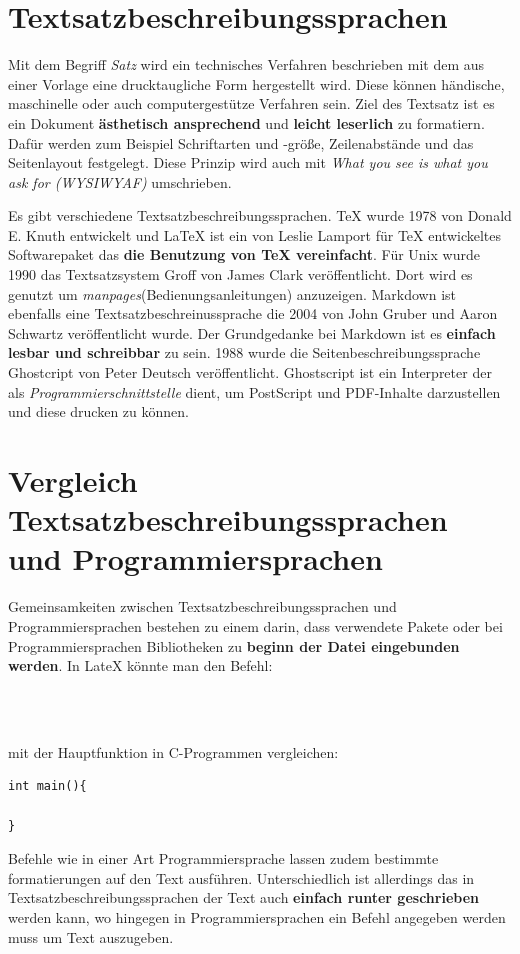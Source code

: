 \section{Textsatzbeschreibungssprachen}
Mit dem Begriff \textit{Satz} wird ein technisches Verfahren beschrieben mit dem aus einer Vorlage eine drucktaugliche Form hergestellt wird. Diese können händische, maschinelle oder auch computergestütze Verfahren sein. Ziel des Textsatz ist es ein Dokument \textbf{ästhetisch ansprechend} und \textbf{leicht leserlich} zu formatiern. Dafür werden zum Beispiel Schriftarten und -größe, Zeilenabstände und das Seitenlayout festgelegt. Diese Prinzip wird auch mit \textit{What you see is what you ask for (WYSIWYAF)} umschrieben.\par
Es gibt verschiedene Textsatzbeschreibungssprachen. TeX wurde 1978 von Donald E. Knuth entwickelt und LaTeX ist ein von Leslie Lamport für TeX entwickeltes Softwarepaket das \textbf{die Benutzung von TeX vereinfacht}. Für Unix wurde 1990 das Textsatzsystem Groff von James Clark veröffentlicht. Dort wird es genutzt um \textit{manpages}(Bedienungsanleitungen) anzuzeigen. Markdown ist ebenfalls eine Textsatzbeschreinussprache die 2004 von John Gruber und Aaron Schwartz veröffentlicht wurde. Der Grundgedanke bei Markdown ist es \textbf{einfach lesbar und schreibbar} zu sein. 1988 wurde die Seitenbeschreibungssprache Ghostcript von Peter Deutsch veröffentlicht. Ghostscript ist ein Interpreter der als \textit{Programmierschnittstelle} dient, um PostScript und PDF-Inhalte darzustellen und diese drucken zu können. 

\section{Vergleich Textsatzbeschreibungssprachen und Programmiersprachen}
Gemeinsamkeiten zwischen Textsatzbeschreibungssprachen und Programmiersprachen bestehen zu einem darin, dass verwendete Pakete oder bei Programmiersprachen Bibliotheken zu \textbf{beginn der Datei eingebunden werden}. In LateX könnte man den Befehl:
\begin{lstlisting}
 


\end{lstlisting}

mit der Hauptfunktion in C-Programmen vergleichen:

\begin{lstlisting}
int main(){

} 
\end{lstlisting}
Befehle wie in einer Art Programmiersprache lassen zudem bestimmte formatierungen auf den Text ausführen.
Unterschiedlich ist allerdings das in Textsatzbeschreibungssprachen der Text auch \textbf{einfach runter geschrieben} werden kann, wo hingegen in Programmiersprachen ein Befehl angegeben werden muss um Text auszugeben.

